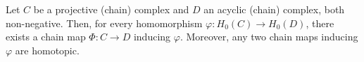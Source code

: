 Let $C$ be a projective (chain) complex and $D$ an acyclic (chain) complex, both non-negative. Then, for every homomorphism $\varphi : H_0(C) \to H_0(D)$, there exists a chain map $\Phi : C \to D$ inducing $\varphi$. Moreover, any two chain maps inducing $\varphi$ are homotopic.